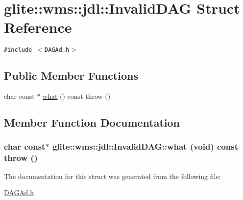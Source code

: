 \hypertarget{structglite_1_1wms_1_1jdl_1_1InvalidDAG}{
\section{glite::wms::jdl::Invalid\-DAG Struct Reference}
\label{structglite_1_1wms_1_1jdl_1_1InvalidDAG}
}
{\tt \#include $<$DAGAd.h$>$}

\subsection*{Public Member Functions}
\begin{CompactItemize}
\item 
char const $\ast$ \hyperlink{structglite_1_1wms_1_1jdl_1_1InvalidDAG_a0}{what} () const   throw ()
\end{CompactItemize}


\subsection{Member Function Documentation}
\hypertarget{structglite_1_1wms_1_1jdl_1_1InvalidDAG_a0}{
\subsubsection[what]{\setlength{\rightskip}{0pt plus 5cm}char const$\ast$ glite::wms::jdl::Invalid\-DAG::what (void) const  throw ()}}
\label{structglite_1_1wms_1_1jdl_1_1InvalidDAG_a0}




The documentation for this struct was generated from the following file:\begin{CompactItemize}
\item 
\hyperlink{DAGAd_8h}{DAGAd.h}\end{CompactItemize}
